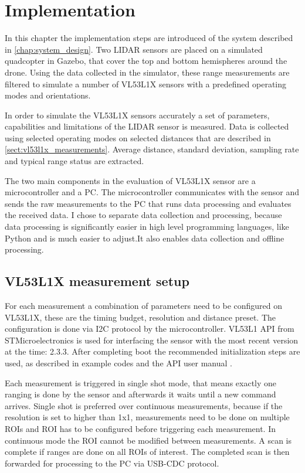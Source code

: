 \chapter{Implementation}
In this chapter the implementation steps are introduced of the system described in 
\ref{chap:system_design}. Two LIDAR sensors are placed on a simulated quadcopter in Gazebo, 
that cover the top and bottom hemispheres around the drone. Using the data collected in the
simulator, these range measurements are filtered to simulate a number of VL53L1X sensors with 
a predefined operating modes and orientations. 

In order to simulate the VL53L1X sensors accurately a set of parameters, capabilities and 
limitations of the LIDAR sensor is measured. Data is collected using selected operating modes
on selected distances that are described in \ref{sect:vl53l1x_measurements}. Average distance,
standard deviation, sampling rate and typical range status are extracted. 

The two main components in the evaluation of VL53L1X sensor are a microcontroller and a PC. The 
microcontroller communicates with the sensor and sends the raw measurements to the PC that runs 
data processing and evaluates the received data. I chose to separate data collection and processing,
because data processing is significantly easier in high level programming languages, like Python and 
is much easier to adjust.It also enables data collection and offline processing.


\section{VL53L1X measurement setup}
For each measurement a combination of parameters need to be configured on VL53L1X, these are the 
timing budget, resolution and distance preset. The configuration is done via I2C protocol by the
microcontroller. VL53L1 API from STMicroelectronics is used for interfacing the sensor with the most
recent version at the time: 2.3.3. After completing boot the recommended initialization steps are 
used, as described in example codes and the API user manual \cite{VL53L1XAPIManual}.

Each measurement is triggered in single shot mode, that means exactly one ranging is done by the 
sensor and afterwards it waits until a new command arrives.  Single shot is preferred over continuous
measurements, because if the resolution is set to higher than 1x1, measurements need to be done on 
multiple ROIs and ROI has to be configured before triggering each measurement. In continuous mode 
the ROI cannot be modified between measurements.
A scan is complete if ranges are done on all ROIs of interest. The completed scan is then forwarded 
for processing to the PC via USB-CDC protocol.

